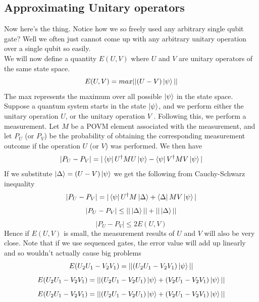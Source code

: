 \documentclass{report}
\begin{document}
\subsection{Approximating Unitary operators}
Now here's the thing. Notice how we so freely used any arbitrary single qubit gate? Well we often just cannot come up with any arbitrary unitary operation over a single qubit so easily.\\
We will now define a quantity $E(U,V)$ where $U$ and $V$ are unitary operators of the same state space.
\begin{equation}E(U,V) = max||(U - V)\ket{\psi}||\end{equation}
The max represents the maximum over all possible $\ket{\psi}$ in the state space. Suppose a quantum system starts in the state $\ket{\psi}$, and we perform either the unitary operation $U$, or the unitary operation $V$ . Following this, we perform a measurement. Let $M$ be a POVM element associated with the measurement, and let $P_U$ (or $P_V$) be the probability of obtaining the corresponding measurement outcome if the operation $U$ (or $V$) was performed. We then have
\begin{equation}|P_U - P_V| = |\bra{\psi}U^{\dagger}MU\ket{\psi} - \bra{\psi}V^{\dagger}MV\ket{\psi}|\end{equation}
If we substitute $\ket{\Delta} = (U - V)\ket{\psi}$ we get the following from Cauchy-Schwarz inequality
\begin{equation}|P_U - P_V| = |\bra{\psi}U^{\dagger}M\ket{\Delta} + \bra{\Delta}MV\ket{\psi}|\end{equation}
\begin{equation}|P_U - P_V| \leq ||\ket{\Delta}|| + ||\ket{\Delta}||\end{equation}
\begin{equation}|P_U - P_V| \leq 2E(U,V)\end{equation}
Hence if $E(U,V)$ is small, the measurement results of $U$ and $V$ will also be very close. Note that if we use sequenced gates, the error value will add up linearly and so wouldn't actually cause big problems
\begin{equation}E(U_{2}U_{1} - V_{2}V_{1}) = ||(U_{2}U_{1} - V_{2}V_{1})\ket{\psi}||\end{equation}
\begin{equation}E(U_{2}U_{1} - V_{2}V_{1}) = ||(U_{2}U_{1} - V_{2}U_{1})\ket{\psi} + (V_{2}U_{1} - V_{2}V_{1})\ket{\psi}||\end{equation}
\begin{equation}E(U_{2}U_{1} - V_{2}V_{1}) = ||(U_{2}U_{1} - V_{2}U_{1})\ket{\psi} + (V_{2}U_{1} - V_{2}V_{1})\ket{\psi}||\end{equation}
\end{document}
